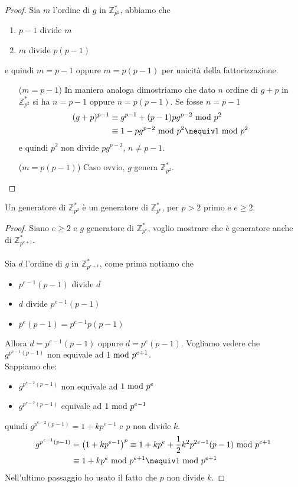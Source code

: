 \begin{proof}
	Sia $m$ l'ordine di $g$ in $\mathbb{Z}_{p^2}^*$, abbiamo che
	\begin{enumerate}
		\item $p-1$ divide $m$
		\item $m$ divide $p(p-1)$
	\end{enumerate}
	e quindi $m=p-1$ oppure $m=p(p-1)$ per unicità della fattorizzazione.
	\begin{itemize}
		\item[($m=p-1$)] In maniera analoga dimostriamo che dato $n$ ordine di $g+p$ in $\mathbb{Z}_{p^2}^*$ si ha $n=p-1$ oppure $n=p(p-1)$. Se fosse $n=p-1$
		\begin{align*}
		(g+p)^{p-1}&\equiv g^{p-1}+(p-1)pg^{p-2}\Mod p^2\\ 
		&\equiv 1-pg^{p-2}\Mod p^2 \nequiv 1\Mod p^2
		\end{align*}
		e quindi $p^2$ non divide $pg^{p-2}$, $n\neq p-1$.
		\item[($m=p(p-1)$)] Caso ovvio, $g$ genera $\mathbb{Z}_{p^2}^*$.
	\end{itemize}
\end{proof}
\begin{corollario}
	Un generatore di $\mathbb{Z}_{p^2}^*$ è un generatore di $\mathbb{Z}_{p^e}^*$,  per $p > 2$ primo e $e\geq2$.
\end{corollario}
\begin{proof}
	Siano $e\geq2$ e $g$ generatore di $\mathbb{Z}_{p^e}^*$, voglio mostrare che è generatore anche di $\mathbb{Z}_{p^{e+1}}^*$. \\ \\ Sia $d$ l'ordine di $g$ in $\mathbb{Z}_{p^{e+1}}^*$, come prima notiamo che 
	\begin{itemize}
		\item $p^{e-1}(p-1)$ divide $d$
		\item $d$ divide $p^{e-1}(p-1)$
		\item $p^e(p-1)=p^{e-1}p(p-1)$
	\end{itemize}
Allora $d=p^{e-1}(p-1)$ oppure $d=p^e(p-1)$. Vogliamo vedere che $g^{p^{e-1}(p-1)}$ non equivale ad $1\ \mathrm{mod}\ p^{e+1}$. \\ Sappiamo che:
\begin{itemize}
	\item $g^{p^{e-2}(p-1)}$ non equivale ad $1\ \mathrm{mod}\ p^e$
	\item $g^{p^{e-2}(p-1)}$ equivale ad $1\ \mathrm{mod}\ p^{e-1}$
\end{itemize}
quindi $g^{p^{e-2}(p-1)}=1+kp^{e-1}$ e $p$ non divide $k$.
\begin{align*}
g^{p^{e-1}(p-1)}&=\left(1+kp^{e-1}\right)^p\equiv 1+kp^e+\frac{1}{2}k^2p^{2e-1}(p-1)\Mod p^{e+1}\\
&\equiv 1+kp^e\Mod p^{e+1}\nequiv1\Mod p^{e+1}
\end{align*}
Nell'ultimo passaggio ho usato il fatto che $p$ non divide $k$.
\end{proof}
